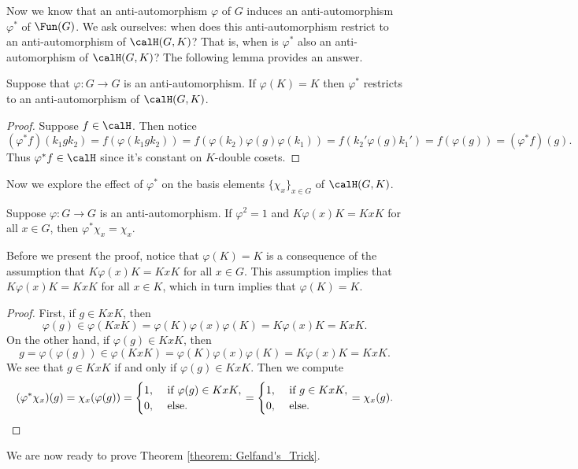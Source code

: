 Now we know that an anti-automorphism $\varphi$ of $G$ induces an anti-automorphism $\varphi^\ast$ of $\Fun(G)$.
We ask ourselves: when does this anti-automorphism restrict to an anti-automorphism of $\calH(G,K)$?
That is, when is $\varphi^\ast$ also an anti-automorphism of $\calH(G,K)$? The following lemma provides an answer.
\begin{lem}
	Suppose that $\varphi\colon G\to G$ is an anti-automorphism.
	If $\varphi(K)=K$ then $\varphi^\ast$ restricts to an anti-automorphism of $\calH(G,K)$.
\end{lem}
\begin{proof}
	Suppose $f\in\calH$.
	Then notice
	\[
		(\varphi^\ast f)(k_1gk_2) = f(\varphi(k_1gk_2)) = f(\varphi(k_2)\varphi(g)\varphi(k_1)) = f(k_2'\varphi(g)k_1') = f(\varphi(g)) = (\varphi^\ast f)(g).
	\]
	Thus $\varphi^\ast f \in\calH$ since it's constant on $K$-double cosets.
\end{proof}
Now we explore the effect of $\varphi^\ast$ on the basis elements $\{\chi_x\}_{x\in G}$ of $\calH(G,K)$.
\begin{lem}\label{lem: id_on_basis}
	Suppose $\varphi\colon G\to G$ is an anti-automorphism.
	If $\varphi^2=1$ and $K\varphi(x)K=KxK$ for all $x\in G$, then $\varphi^\ast\chi_x=\chi_x$.
\end{lem}
Before we present the proof, notice that $\varphi(K)=K$ is a consequence of the assumption that $K\varphi(x)K=KxK$ for all $x\in G$.
This assumption implies that $K\varphi(x)K=KxK$ for all $x\in K$, which in turn implies that $\varphi(K)=K$.
\begin{proof}
	First, if $g\in KxK$, then
	\[
		\varphi(g)\in \varphi(KxK) = \varphi(K)\varphi(x)\varphi(K) = K\varphi(x)K = KxK.
	\]
	On the other hand, if $\varphi(g)\in KxK$, then
	\[
		g = \varphi(\varphi(g)) \in \varphi(KxK) = \varphi(K)\varphi(x)\varphi(K) = K\varphi(x)K = KxK.
	\]
	We see that $g\in KxK$ if and only if $\varphi(g)\in KxK$.
	Then we compute
	\[
		(\varphi^\ast\chi_x)(g) = \chi_x(\varphi(g)) = \begin{cases}
			1,\  & \text{if}\ \varphi(g)\in KxK, \\
			0,\  & \text{else}.
		\end{cases} = \begin{cases}
			1,\  & \text{if}\ g\in KxK, \\
			0,\  & \text{else}.
		\end{cases} = \chi_x(g).\qedhere
	\]
\end{proof}
We are now ready to prove Theorem \ref{theorem: Gelfand's_Trick}.
